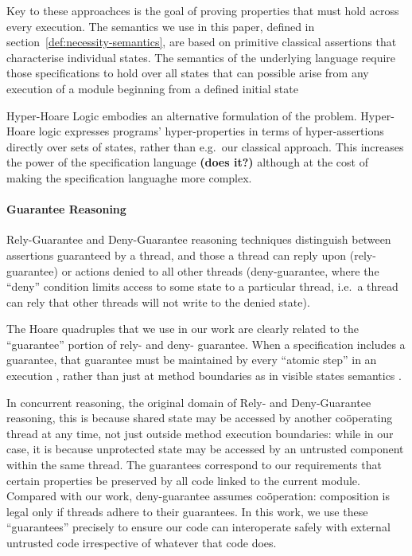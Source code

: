 Key to these approachces is the goal of proving properties that must
hold across every execution. The semantics we use in this paper,
defined in section~\ref{def:necessity-semantics}, are based on
primitive classical assertions that characterise individual states.
The semantics of the underlying language require those
specifications to hold over all states that can possible arise from
any execution of a module beginning from a defined initial state

Hyper-Hoare Logic \cite{hyper-hoare-pldi2024} embodies 
an alternative formulation of the problem. Hyper-Hoare logic expresses
programs' hyper-properties in terms of hyper-assertions directly over
sets of states, rather than e.g.\ our classical approach. This
increases the power of the specification language \textbf{(does it?)}
although at the cost of making the specification languaghe more complex.

\paragraph{Guarantee Reasoning}

Rely-Guarantee
\cite{relyGuarantee-HayesJones-setss2017,relyGuarantee-vanStaden-mpc2015}
and Deny-Guarantee \cite{DenyGuarantee} reasoning techniques
distinguish between assertions guaranteed by a thread, and those a
thread can reply upon (rely-guarantee) or actions denied to all other
threads (deny-guarantee, where the ``deny'' condition limits access to
some state to a particular thread, i.e.\ a thread can rely that other
threads will not write to the denied state).

The Hoare quadruples that we use in our work are clearly related to
the ``guarantee'' portion of rely- and deny- guarantee. When a
specification includes a guarantee, that guarantee must be maintained
by every ``atomic step'' in an execution
\cite{relyGuarantee-HayesJones-setss2017}, rather than just at method
boundaries as in visible states semantics
\cite{MuellerPoetzsch-HeffterLeavens06,DrossoFrancaMuellerSummers08,considerate}.

In concurrent reasoning, the original domain of Rely- and
Deny-Guarantee reasoning, this is because shared state may be accessed
by another co{\"o}perating thread at any time, not just outside method
execution boundaries: while in our case, it is because unprotected
state may be accessed by an untrusted component within the same
thread.  The guarantees correspond to our requirements that certain
properties be preserved by all code linked to the current
module. Compared with our work, deny-guarantee assumes
co{\"o}peration: composition is legal only if threads adhere to their
guarantees. In this work, we use these ``guarantees'' precisely to
ensure our code can interoperate safely with external untrusted code
irrespective of whatever that code does.




